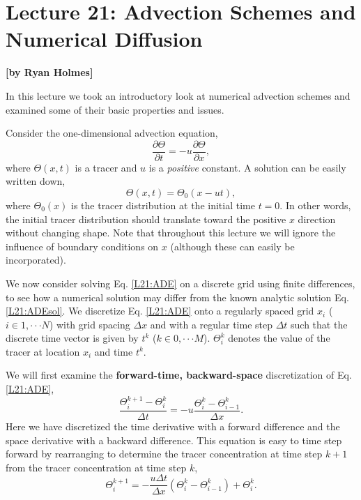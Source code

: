 
\section{Lecture 21: Advection Schemes and Numerical Diffusion}
\begin{flushright}\textbf{[by Ryan Holmes]}\end{flushright}

In this lecture we took an introductory look at numerical advection
schemes and examined some of their basic properties and issues.

Consider the one-dimensional advection equation,
\begin{equation}
\frac{\partial\Theta}{\partial t} = -u \frac{\partial\Theta}{\partial x},\label{L21:ADE}
\end{equation}
where $\Theta(x,t)$ is a tracer and $u$ is a \textit{positive}
constant. A solution can be easily written down,
\begin{equation}
\Theta(x,t) = \Theta_0(x-ut),\label{L21:ADEsol}
\end{equation}
where $\Theta_0(x)$ is the tracer distribution at the initial time
$t=0$. In other words, the initial tracer distribution should
translate toward the positive $x$ direction without changing
shape. Note that throughout this lecture we will ignore the influence
of boundary conditions on $x$ (although these can easily be
incorporated).

We now consider solving Eq. \eqref{L21:ADE} on a discrete grid using
finite differences, to see how a numerical solution may differ from
the known analytic solution Eq. \eqref{L21:ADEsol}. We discretize
Eq. \eqref{L21:ADE} onto a regularly spaced grid $x_i$
($i\in 1,\cdot\cdot\cdot N$) with grid spacing $\Delta x$ and with a
regular time step $\Delta t$ such that the discrete time vector is
given by $t^k$ ($k\in 0,\cdot\cdot\cdot M$). $\Theta_i^k$ denotes the
value of the tracer at location $x_i$ and time $t^k$.

We will first examine the \textbf{forward-time, backward-space}
discretization of Eq. \eqref{L21:ADE},
\begin{equation}
  \frac{\Theta_i^{k+1}-\Theta_i^k}{\Delta t} = -u
  \frac{\Theta_i^k-\Theta^k_{i-1}}{\Delta x}.\label{L21:FTBS}
\end{equation}
Here we have discretized the time derivative with a forward
difference and the space derivative with a backward difference. This
equation is easy to time step forward by rearranging to determine the tracer
concentration at time step $k+1$ from the tracer concentration at time
step $k$,
\begin{equation}
  \Theta_i^{k+1} = -\frac{u\Delta t}{\Delta x}\left(\Theta_i^k-\Theta^k_{i-1}\right)+\Theta_i^k.\label{L21:EXTS}
\end{equation}

